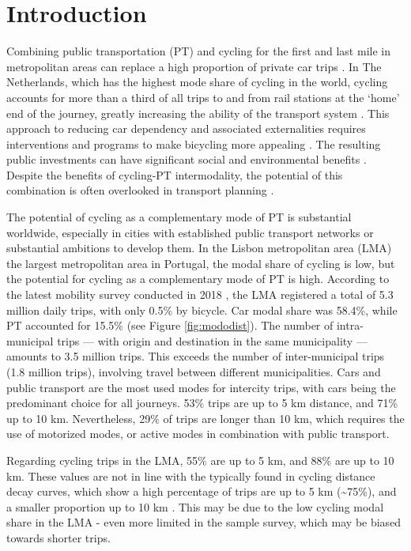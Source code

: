 \documentclass[review, doubleblind, 3p,
authoryear]{elsarticle} %
\begin{document}
\hypersetup{citecolor=black}

\section{Introduction}\label{introduction}

Combining public transportation (PT) and cycling for the first and last
mile in metropolitan areas can replace a high proportion of private car
trips \citep{MARTENS2007326, van2021insights}. In The Netherlands, which
has the highest mode share of cycling in the world, cycling accounts for
more than a third of all trips to and from rail stations at the `home'
end of the journey, greatly increasing the ability of the transport
system \citep{RIETVELD200071}. This approach to reducing car dependency
and associated externalities requires interventions and programs to make
bicycling more appealing \citep{lapaix_role_2021}. The resulting public
investments can have significant social and environmental benefits
\citep{internationaltransportforum_integrating_2017}. Despite the
benefits of cycling-PT intermodality, the potential of this combination
is often overlooked in transport planning \citep{lapaix_role_2021}.

The potential of cycling as a complementary mode of PT is substantial
worldwide, especially in cities with established public transport
networks or substantial ambitions to develop them. In the Lisbon
metropolitan area (LMA) the largest metropolitan area in Portugal, the
modal share of cycling is low, but the potential for cycling as a
complementary mode of PT is high. According to the latest mobility
survey conducted in 2018 \citep{IMOB}, the LMA registered a total of 5.3
million daily trips, with only 0.5\% by bicycle. Car modal share was
58.4\%, while PT accounted for 15.5\% (see Figure \ref{fig:mododist}).
The number of intra-municipal trips --- with origin and destination in
the same municipality --- amounts to 3.5 million trips. This exceeds the
number of inter-municipal trips (1.8 million trips), involving travel
between different municipalities. Cars and public transport are the most
used modes for intercity trips, with cars being the predominant choice
for all journeys. 53\% trips are up to 5 km distance, and 71\% up to 10
km. Nevertheless, 29\% of trips are longer than 10 km, which requires
the use of motorized modes, or active modes in combination with public
transport.

Regarding cycling trips in the LMA, 55\% are up to 5 km, and 88\% are up
to 10 km. These values are not in line with the typically found in
cycling distance decay curves, which show a high percentage of trips are
up to 5 km (\textasciitilde75\%), and a smaller proportion up to 10 km
\citep{krizek2007detailed, larsen2010beyond, DDfunction2023}. This may
be due to the low cycling modal share in the LMA - even more limited in
the sample survey, which may be biased towards shorter trips.
\end{document}
